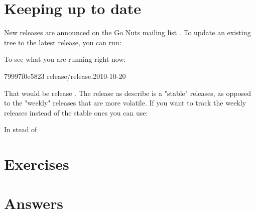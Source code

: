 \section{Keeping up to date}
New releases are announced on the Go Nuts mailing list \cite{go_nuts}. To update an
existing tree to the latest release, you can run:
\begin{display}
\pr {}
\pr {}
\pr {}
\pr {}
\pr {}
\end{display}
\noindent{}To see what you are running right now:
\begin{display}
\pr {}
\pr {}
79997f0e5823 release/release.2010-10-20
\end{display}
\noindent{}That would be release . The release as 
describe is a "stable" releases,
as opposed to the "weekly" releases that are more volatile. 
If you want to track the weekly releases
instead of the stable ones you can use:
\begin{display}
\pr {}
\end{display}
In stead of
\begin{display}
\pr {}
\end{display}

\section{Exercises}


\cleardoublepage
\section{Answers}
\shipoutAnswer
